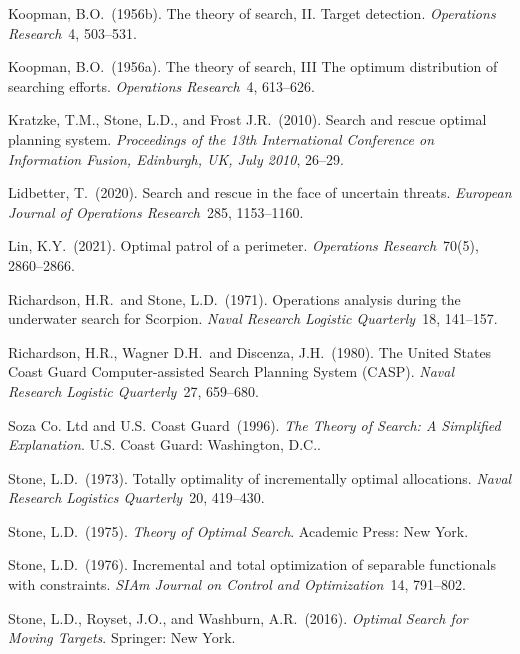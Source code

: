 \documentclass[12pt]{article}
\theoremstyle{plain}
\theoremstyle{definition}
\theoremstyle{remark}
\begin{document}
\begin{description}
\item{} Koopman, B.O.~(1956b). The theory of search, II. Target detection. \emph{Operations Research}~4, 503--531. 


\item{} Koopman, B.O.~(1956a). The theory of search, III The optimum distribution of searching efforts. \emph{Operations Research}~4, 613--626. 

\item{} Kratzke, T.M., Stone, L.D., and Frost J.R.~(2010). Search and rescue optimal planning system.   \emph{Proceedings of the 13th International Conference on Information Fusion, Edinburgh, UK, July 2010}, 26--29.

\item{} Lidbetter, T.~(2020). Search and rescue in the face of uncertain threats. \emph{European Journal of Operations Research}~285, 1153--1160.

\item{} Lin, K.Y.~(2021). Optimal patrol of a perimeter. \emph{Operations Research}~70(5), 2860--2866.

\item{} Richardson, H.R.~and Stone, L.D.~(1971). Operations analysis during the underwater search for Scorpion. \emph{Naval Research Logistic Quarterly}~18, 141--157. 

\item{} Richardson, H.R., Wagner D.H.~and Discenza, J.H.~(1980). The United States Coast Guard Computer-assisted Search Planning System (CASP). \emph{Naval Research Logistic Quarterly}~27,  659--680. 

\item{} Soza Co. Ltd and U.S. Coast Guard~(1996).  \emph{The Theory of Search: A Simplified Explanation}.  U.S. Coast Guard: Washington, D.C..


\item{} Stone, L.D.~(1973). Totally optimality of incrementally optimal allocations. \emph{Naval Research Logistics Quarterly}~20, 419--430.

\item{} Stone, L.D.~(1975). \emph{Theory of Optimal Search}.  Academic Press: New York.


\item{} Stone, L.D.~(1976). Incremental and total optimization of separable functionals with constraints. \emph{SIAm Journal on Control and Optimization}~14,  791--802.

\item{} Stone, L.D., Royset, J.O., and Washburn, A.R.~(2016). \emph{Optimal Search for Moving Targets}. Springer: New York.


\end{description}
\end{document}
